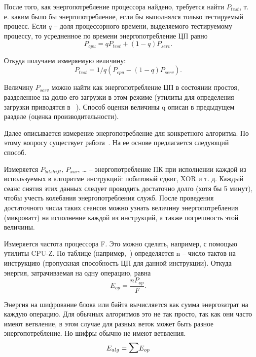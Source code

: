 После того, как энергопотребление процессора найдено, требуется найти $P_{test}$, т. е. каким было бы энергопотребление, если бы выполнялся только тестируемый процесс. Если $q$ – доля процессорного времени, выделяемого тестируемому процессу, то усредненное по времени энергопотребление ЦП равно
\begin{equation}
P_{cpu} = q P_{test} + (1 - q)P_{serv}.
\end{equation}

Откуда получаем измеряемую величину:
\begin{equation}
P_{test} = 1/q ( P_{cpu} - (1 - q) P_{serv}).
\end{equation}

Величину $P_{serv}$ можно найти как энергопотребление ЦП в состоянии простоя, разделенное на долю его загрузки в этом режиме (утилиты для определения загрузки приводятся в~\cite{src69} ). Способ оценки величины q описан в предыдущем разделе (оценка производительности).

Далее описывается измерение энергопотребление для конкретного алгоритма. По этому вопросу существует работа~\cite{src71}. На ее основе предлагается следующий способ.

Измеряется $P_{bitshift}$, $P_{xor}$, … -- энергопотребление ПК при исполнении каждой из используемых в алгоритме инструкций: побитовый сдвиг, XOR и т. д. Каждый сеанс снятия этих данных следует проводить достаточно долго (хотя бы 5 минут), чтобы учесть колебания энергопотребления служб. После проведения достаточного числа таких сеансов можно узнать величину энергопотребления (микроватт) на исполнение каждой из инструкций, а также погрешность этой величины.

Измеряется частота процессора F. Это можно сделать, например, с помощью утилиты CPU-Z. По таблице (например,~\cite{src60}) определяется n – число тактов на инструкцию (пропускная способность ЦП для данной инструкции). Откуда энергия, затрачиваемая на одну операцию, равна
\begin{equation}
E_{op} = \frac{ nP_{op} }{ F }.
\end{equation}

Энергия на шифрование блока или байта вычисляется как сумма энергозатрат на каждую операцию. Для обычных алгоритмов это не так просто, так как они часто имеют ветвление, в этом случае для разных веток может быть разное энергопотребление. Но шифры обычно не имеют ветвления.
\begin{equation}
E_{alg} = \mathlarger{\mathlarger{\sum}}E_{op}
\end{equation}

